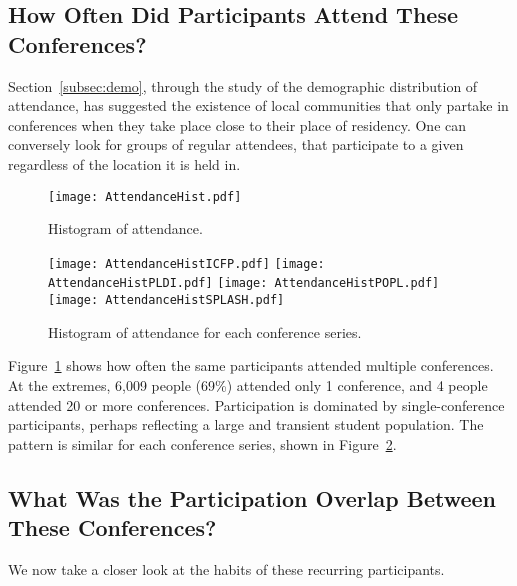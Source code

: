 \subsection{How Often Did Participants Attend These Conferences?}
\label{subsec:overlap}

Section~\ref{subsec:demo}, through the study of the demographic distribution of
attendance, has suggested the existence of local communities that only
partake in conferences when they take place close to their place of residency.
One can conversely look for groups of regular attendees, that participate to a given \conf
regardless of the location it is held in.

\begin{figure}
  \centering
  \texttt{[image: AttendanceHist.pdf]}
  \caption{Histogram of attendance.}
  \label{fig:hist_attendance}
\end{figure}

\begin{figure}
  \centering
  \texttt{[image: AttendanceHistICFP.pdf]}
  \texttt{[image: AttendanceHistPLDI.pdf]}
  \texttt{[image: AttendanceHistPOPL.pdf]}
  \texttt{[image: AttendanceHistSPLASH.pdf]}
  \caption{Histogram of attendance for each conference series.}
  \label{fig:hist_attendance_per_conference}
\end{figure}

Figure~\ref{fig:hist_attendance} shows how often the same participants attended
multiple conferences. At the extremes, 6,009 people (69\%) attended only 1
conference, and 4 people attended 20 or more conferences. Participation is
dominated by single-conference participants, perhaps reflecting a large and
transient student population. The pattern is similar for each conference series,
shown in Figure~\ref{fig:hist_attendance_per_conference}.


\subsection{What Was the Participation Overlap Between These Conferences?}

We now take a closer look at the habits of these recurring participants.

